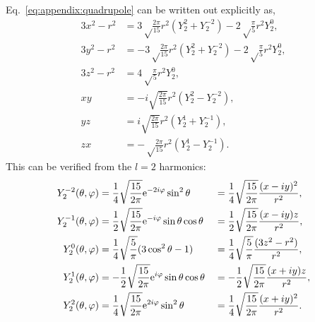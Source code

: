 Eq.~\ref{eq:appendix:quadrupole} can be written out explicitly as, 
\begin{align}
	3x^2 - r^2 &= 3\sqrt\frac{2\pi}{15}r^2(Y^2_2+Y^{-2}_2) - 2\sqrt\frac{\pi}{5}r^2Y^0_2, \\
	3y^2 - r^2 &= -3\sqrt\frac{2\pi}{15}r^2(Y^2_2+Y^{-2}_2) - 2\sqrt\frac{\pi}{5}r^2Y^0_2, \\
	3z^2 - r^2 &= 4\sqrt\frac{\pi}{5}r^2Y^0_2, \\
	xy &= -i\sqrt{\frac{2\pi}{15}}r^2(Y^2_2-Y^{-2}_2), \\
	yz &= i\sqrt{\frac{2\pi}{15}}r^2(Y_2^1+Y_2^{-1}), \\
	zx &= -\sqrt\frac{2\pi}{15}r^2(Y_2^1 - Y_2^{-1}).
\end{align}
This can be verified from the $l=2$ harmonics:
\begin{alignat}{2}
	Y_{2}^{-2}(\theta,\varphi)
	& = \frac{1}{4}\sqrt\frac{15}{2\pi}\mathrm{e}^{-2i\varphi}\sin^{2}\theta
	&& = \frac{1}{4}\sqrt\frac{15}{2\pi}\frac{(x - iy)^2}{r^{2}}, \\
	Y_{2}^{-1}(\theta,\varphi)
	& = \frac{1}{2}\sqrt\frac{15}{2\pi}\mathrm{e}^{-i\varphi}\sin\theta\cos\theta
	&& = \frac{1}{2}\sqrt\frac{15}{2\pi}\frac{(x - iy)z}{r^{2}}, \\
	Y_{2}^{ 0}(\theta,\varphi)
	& = \frac{1}{4}\sqrt\frac{5}{\pi}(3\cos^{2}\theta-1)
	&& = \frac{1}{4}\sqrt\frac{5}{\pi}{(3z^{2}-r^{2})\over r^{2}}, \\
	Y_{2}^{ 1}(\theta,\varphi)
	& = -\frac{1}{2}\sqrt\frac{15}{2\pi}\mathrm{e}^{  i\varphi}\sin\theta\cos\theta
	&& = -\frac{1}{2}\sqrt\frac{15}{2\pi}\frac{(x + iy) z}{r^{2}}, \\
	Y_{2}^{ 2}(\theta,\varphi)
	& = \frac{1}{4}\sqrt\frac{15}{2\pi}\mathrm{e}^{ 2i\varphi}\sin^{2}\theta
	&& = \frac{1}{4}\sqrt\frac{15}{2\pi}\frac{(x + iy)^2}{r^{2}}.
\end{alignat}
